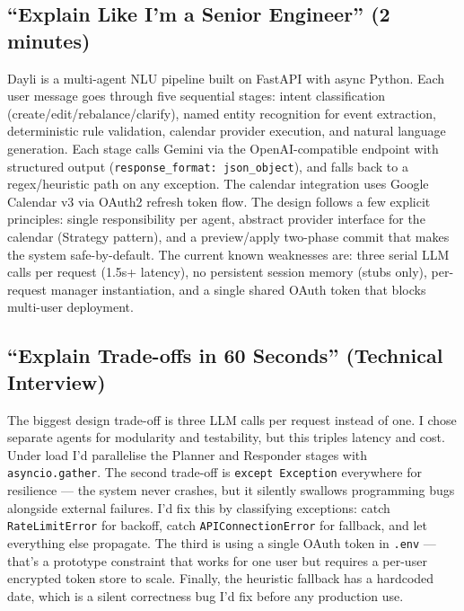 \documentclass[12pt, a4paper]{article}
\begin{document}
\subsection{``Explain Like I'm a Senior Engineer'' (2 minutes)}

\begin{interviewbox}
  Dayli is a multi-agent NLU pipeline built on FastAPI with async Python. Each user message goes through five sequential stages: intent classification (create/edit/rebalance/clarify), named entity recognition for event extraction, deterministic rule validation, calendar provider execution, and natural language generation. Each stage calls Gemini via the OpenAI-compatible endpoint with structured output (\texttt{response\_format: json\_object}), and falls back to a regex/heuristic path on any exception. The calendar integration uses Google Calendar v3 via OAuth2 refresh token flow. The design follows a few explicit principles: single responsibility per agent, abstract provider interface for the calendar (Strategy pattern), and a preview/apply two-phase commit that makes the system safe-by-default. The current known weaknesses are: three serial LLM calls per request (1.5s+ latency), no persistent session memory (stubs only), per-request manager instantiation, and a single shared OAuth token that blocks multi-user deployment.
\end{interviewbox}

\subsection{``Explain Trade-offs in 60 Seconds'' (Technical Interview)}

\begin{interviewbox}
  The biggest design trade-off is three LLM calls per request instead of one. I chose separate agents for modularity and testability, but this triples latency and cost. Under load I'd parallelise the Planner and Responder stages with \texttt{asyncio.gather}. The second trade-off is \texttt{except Exception} everywhere for resilience --- the system never crashes, but it silently swallows programming bugs alongside external failures. I'd fix this by classifying exceptions: catch \texttt{RateLimitError} for backoff, catch \texttt{APIConnectionError} for fallback, and let everything else propagate. The third is using a single OAuth token in \texttt{.env} --- that's a prototype constraint that works for one user but requires a per-user encrypted token store to scale. Finally, the heuristic fallback has a hardcoded date, which is a silent correctness bug I'd fix before any production use.
\end{interviewbox}
\end{document}
